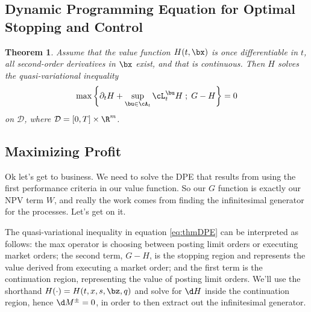 \documentclass[12pt]{article}
\newtheorem{theorem}{Theorem}
\begin{document}
\subsection*{Dynamic Programming Equation for Optimal Stopping and Control}
\begin{theorem}
Assume that the value function $H(t,\bx)$ is once differentiable in $t$, all second-order derivatives in $\bx$ exist, and that  is continuous. Then $H$ solves the quasi-variational inequality
\begin{equation}
\label{eq:thmDPE}
\max \left\lbrace \partial_t H + \sup \limits_{\bu \in \cA_t} \cL^{\bu}_t H \; ; \; G - H \right\rbrace = 0
\end{equation}
on $\mathcal{D}$, where $\mathcal{D} = [0,T] \times \R^m$.
\end{theorem}

\subsection*{Maximizing Profit}
Ok let's get to business. We need to solve the DPE that results from using the first performance criteria in our value function. So our $G$ function is exactly our NPV term $W$, and really the work comes from finding the infinitesimal generator for the processes. Let's get on it.

The quasi-variational inequality in equation \ref{eq:thmDPE} can be interpreted as follows: the max operator is choosing between posting limit orders or executing market orders; the second term, $G-H$, is the stopping region and represents the value derived from executing a market order; and the first term is the continuation region, representing the value of posting limit orders. We'll use the shorthand $H(\cdot) = H(t,x,s,\bz,q)$ and solve for $\d H$ inside the continuation region, hence $\d M^{\pm} = 0$, in order to then extract out the infinitesimal generator.
\end{document}
